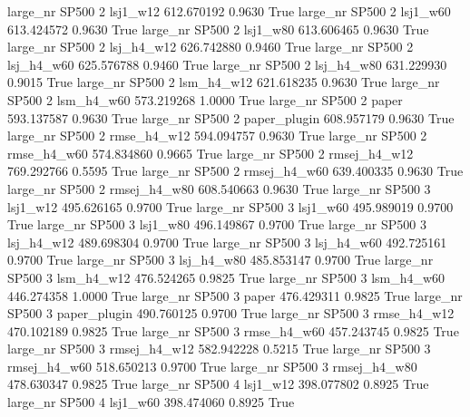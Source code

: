   large_nr    SP500                 2     lsj1_w12  612.670192      0.9630    True
  large_nr    SP500                 2     lsj1_w60  613.424572      0.9630    True
  large_nr    SP500                 2     lsj1_w80  613.606465      0.9630    True
  large_nr    SP500                 2   lsj_h4_w12  626.742880      0.9460    True
  large_nr    SP500                 2   lsj_h4_w60  625.576788      0.9460    True
  large_nr    SP500                 2   lsj_h4_w80  631.229930      0.9015    True
  large_nr    SP500                 2   lsm_h4_w12  621.618235      0.9630    True
  large_nr    SP500                 2   lsm_h4_w60  573.219268      1.0000    True
  large_nr    SP500                 2        paper  593.137587      0.9630    True
  large_nr    SP500                 2 paper_plugin  608.957179      0.9630    True
  large_nr    SP500                 2  rmse_h4_w12  594.094757      0.9630    True
  large_nr    SP500                 2  rmse_h4_w60  574.834860      0.9665    True
  large_nr    SP500                 2 rmsej_h4_w12  769.292766      0.5595    True
  large_nr    SP500                 2 rmsej_h4_w60  639.400335      0.9630    True
  large_nr    SP500                 2 rmsej_h4_w80  608.540663      0.9630    True
  large_nr    SP500                 3     lsj1_w12  495.626165      0.9700    True
  large_nr    SP500                 3     lsj1_w60  495.989019      0.9700    True
  large_nr    SP500                 3     lsj1_w80  496.149867      0.9700    True
  large_nr    SP500                 3   lsj_h4_w12  489.698304      0.9700    True
  large_nr    SP500                 3   lsj_h4_w60  492.725161      0.9700    True
  large_nr    SP500                 3   lsj_h4_w80  485.853147      0.9700    True
  large_nr    SP500                 3   lsm_h4_w12  476.524265      0.9825    True
  large_nr    SP500                 3   lsm_h4_w60  446.274358      1.0000    True
  large_nr    SP500                 3        paper  476.429311      0.9825    True
  large_nr    SP500                 3 paper_plugin  490.760125      0.9700    True
  large_nr    SP500                 3  rmse_h4_w12  470.102189      0.9825    True
  large_nr    SP500                 3  rmse_h4_w60  457.243745      0.9825    True
  large_nr    SP500                 3 rmsej_h4_w12  582.942228      0.5215    True
  large_nr    SP500                 3 rmsej_h4_w60  518.650213      0.9700    True
  large_nr    SP500                 3 rmsej_h4_w80  478.630347      0.9825    True
  large_nr    SP500                 4     lsj1_w12  398.077802      0.8925    True
  large_nr    SP500                 4     lsj1_w60  398.474060      0.8925    True
